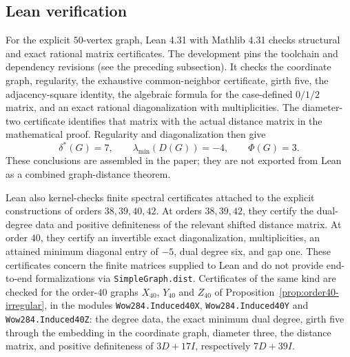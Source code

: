 \documentclass[a4paper,10pt,reqno]{amsart}
\theoremstyle{plain}
\theoremstyle{definition}
\theoremstyle{remark}
\begin{document}
\subsection{Lean verification}

For the explicit \(50\)-vertex graph, Lean 4.31 with Mathlib 4.31
\cite{deMouraUllrich2021,Mathlib2020} checks structural and exact rational
matrix certificates.  The development pins the toolchain and dependency
revisions (see the preceding subsection).  It checks the coordinate graph,
regularity, the exhaustive common-neighbor certificate, girth five,
the adjacency-square identity, the algebraic formula for the case-defined
\(0/1/2\) matrix, and an exact rational diagonalization with multiplicities.
The diameter-two certificate identifies that matrix with the actual
distance matrix in the mathematical proof.  Regularity and diagonalization
then give
\[
 \delta^*(G)=7,\qquad \lambda_{\min}(D(G))=-4,\qquad \Phi(G)=3.
\]
These conclusions are assembled in the paper; they are not exported from
Lean as a combined graph-distance theorem.

Lean also kernel-checks finite spectral certificates attached to the explicit
constructions of orders \(38,39,40,42\).  At orders \(38,39,42\), they
certify the dual-degree data and positive definiteness of the relevant shifted
distance matrix.  At order \(40\), they certify an invertible exact
diagonalization, multiplicities, an attained minimum diagonal entry of \(-5\), dual degree six,
and gap one.  These certificates concern the finite matrices supplied to
Lean and do not provide end-to-end formalizations via
\texttt{SimpleGraph.dist}.
Certificates of the same kind are checked for the order-\(40\) graphs
\(X_{40}\), \(Y_{40}\) and \(Z_{40}\) of
Proposition~\ref{prop:order40-irregular}, in the modules
\texttt{Wow284.Induced40X}, \texttt{Wow284.Induced40Y} and
\texttt{Wow284.Induced40Z}: the degree data, the exact minimum dual degree,
girth five through the embedding in the coordinate graph, diameter three, the
distance matrix, and positive definiteness of \(3D+17I\), respectively
\(7D+39I\).
\end{document}
